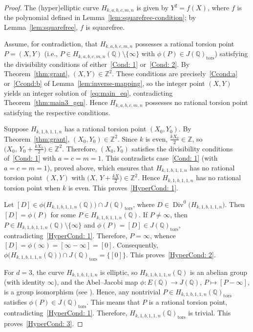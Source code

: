 \documentclass[11pt,a4paper]{amsart}
\newcommand{\ZZ}{\mathbb{Z}}
\newcommand{\Q}{\mathbb{Q}}
\theoremstyle{plain}
\theoremstyle{definition}
\begin{document}
\begin{proof}
The (hyper)elliptic curve $H_{k,a,b,c,m,n}$ is given by $Y^2 = f(X)$, where $f$ is the
polynomial defined in Lemma~\ref{lem:squarefree-condition}; by Lemma~\ref{lem:squarefree},
$f$ is squarefree.

Assume, for contradiction, that $H_{k,a,b,c,m,n}$ possesses a rational torsion point
$P=(X,Y)$ (i.e., $P \in H_{k,a,b,c,m,n}(\Q)\setminus\{\infty\}$ with
$\phi(P) \in J(\Q)_{\mathrm{tors}}$) satisfying the divisibility conditions of
either~\ref{Cond: 1} or~\ref{Cond: 2}. By Theorem~\ref{thm:grant}, $(X,Y)\in\ZZ^2$.
These conditions are precisely~\ref{Ccond:a} or~\ref{Ccond:b} of
Lemma~\ref{lem:inverse-mapping}, so the integer point $(X,Y)$ yields an integer solution
of~\eqref{eq:main_eq}, contradicting Theorem~\ref{thm:main3_gen}. Hence $H_{k,a,b,c,m,n}$
possesses no rational torsion point satisfying the respective conditions.

Suppose $H_{k,1,b,1,1,n}$ has a rational torsion
point $(X_{0},Y_{0})$. By Theorem~\ref{thm:grant}, $(X_{0},Y_{0}) \in \ZZ^{2}$. Since $k$ is even, $\frac{kX_{0}}{2}\in\ZZ$, so $\bigl(X_{0},\,Y_{0}+\frac{kX_{0}}{2}\bigr)\in\ZZ^2$. Therefore, $(X_0,Y_0)$ satisfies the divisibility conditions of~\ref{Cond: 1} with $a=c=m=1$. This contradicts case~\ref{Cond: 1} (with $a=c=m=1$), proved above, which ensures that $H_{k,1,b,1,1,n}$ has no rational torsion point $(X,Y)$ with $\bigl(X,\,Y+\frac{kX}{2}\bigr)\in\ZZ^2$. Hence $H_{k,1,b,1,1,n}$ has no rational torsion point when $k$ is even. This proves~\ref{HyperCond: 1}.

Let $[D] \in \phi\big(H_{k,1,b,1,1,n}(\Q)\big) \cap J(\Q)_{\mathrm{tors}}$, where $D \in \operatorname{Div}^0\!\big(H_{k,1,b,1,1,n}\big)$. Then $[D]=\phi(P)$ for some $P \in H_{k,1,b,1,1,n}(\Q)$. If $P\neq\infty$, then $P\in H_{k,1,b,1,1,n}(\Q)\setminus\{\infty\}$ and $\phi(P)=[D]\in J(\Q)_{\mathrm{tors}}$, contradicting~\ref{HyperCond: 1}. Therefore, $P=\infty$, whence $[D]=\phi(\infty)=[\infty-\infty]=[0]$. Consequently,  $\phi\big(H_{k,1,b,1,1,n}(\Q)\big) \cap J(\Q)_{\mathrm{tors}}=\{[0]\}$. This proves~\ref{HyperCond: 2}.



For $d=3$, the curve $ H_{k,1,b,1,1,n}$ is elliptic, so $H_{k,1,b,1,1,n}(\Q)$ is an abelian group (with identity $\infty$), and the Abel--Jacobi map $\phi\colon E(\Q)\to J(\Q)$, $P\mapsto[P-\infty]$, is a group isomorphism (see \cite[p.~330]{Silvermanarithmetic}). Hence, any nontrivial $P\in H_{k,1,b,1,1,n}(\Q)_{\mathrm{tors}}$ satisfies $\phi(P)\in J(\Q)_{\mathrm{tors}}$. This means that $P$ is a rational torsion point, contradicting~\ref{HyperCond: 1}. Therefore, $H_{k,1,b,1,1,n}(\Q)_{\mathrm{tors}}$ is trivial. This proves~\ref{HyperCond: 3}.
\end{proof}
\end{document}
